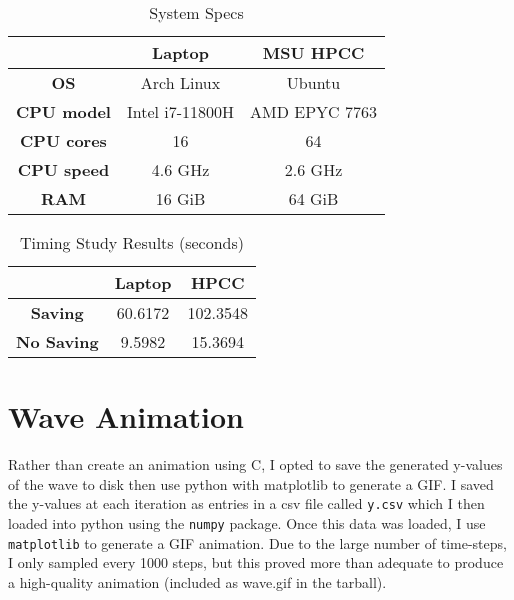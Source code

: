 \documentclass[9pt,technote]{IEEEtran}
\begin{document}
\begin{table}

    \renewcommand{\arraystretch}{1.3}
    \caption{System Specs}
    \centering

    \begin{tabular}{|c||c|c|}
        \hline
         & \textbf{Laptop} & \textbf{MSU HPCC} \\
        \hline \hline
        \textbf{OS} & Arch Linux & Ubuntu \\
        \hline
        \textbf{CPU model} & Intel i7-11800H & AMD EPYC 7763 \\
        \hline
        \textbf{CPU cores} & 16 & 64 \\
        \hline
        \textbf{CPU speed} & 4.6 GHz & 2.6 GHz \\
        \hline
        \textbf{RAM} & 16 GiB & 64 GiB \\
        \hline
    \end{tabular}

\end{table}

\begin{table}

    \renewcommand{\arraystretch}{1.3}
    \caption{Timing Study Results (seconds)}
    \centering

    \begin{tabular}{|c||c|c|}
        \hline
         & \textbf{Laptop} & \textbf{HPCC} \\
         \hline \hline
        \textbf{Saving} & 60.6172 & 102.3548 \\
        \hline
        \textbf{No Saving} & 9.5982 & 15.3694 \\
        \hline
    \end{tabular}

\end{table}

\section{Wave Animation}

Rather than create an animation using C, I opted to save the generated y-values of the wave to disk then use python with matplotlib to generate a GIF. I saved the y-values at each iteration as entries in a csv file called \texttt{y.csv} which I then loaded into python using the \texttt{numpy} package. Once this data was loaded, I use \texttt{matplotlib} to generate a GIF animation. Due to the large number of time-steps, I only sampled every 1000 steps, but this proved more than adequate to produce a high-quality animation (included as wave.gif in the tarball).
\end{document}
